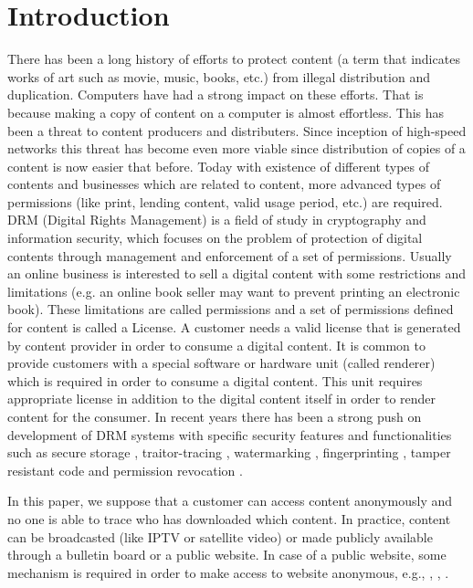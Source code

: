 \documentclass[times]{secauth}
\begin{document}
\section{Introduction}
There has been a long history of efforts to protect content (a term that indicates works of art such as movie, music, books, etc.) from illegal distribution and duplication. Computers have had a strong impact on these efforts. That is because making a copy of content on a computer is almost effortless. This has been a threat to content producers and distributers. Since inception of high-speed networks this threat has become even more viable since distribution of copies of a content is now easier that before. Today with existence of different types of contents and businesses which are related to content, more advanced types of permissions (like print, lending content, valid usage period, etc.) are required.
DRM (Digital Rights Management) is a field of study in cryptography and information security, which focuses on the problem of protection of digital contents through management and enforcement of a set of permissions. Usually an online business is interested to sell a digital content with some restrictions and limitations (e.g. an online book seller may want to prevent printing an electronic book). These limitations are called permissions and a set of permissions defined for content is called a License. A customer needs a valid license that is generated by content provider in order to consume a digital content. It is common to provide customers with a special software or hardware unit (called renderer) which is required in order to consume a digital content. This unit requires appropriate license in addition to the digital content itself in order to render content for the consumer. 
In recent years there has been a strong push on development of DRM systems with specific security features and functionalities such as secure storage \cite{N1}, traitor-tracing \cite{N2, N3, N4, N5, N6, N7, N8}, watermarking \cite{N9, N10, N11, N12, N13}, fingerprinting \cite{N14, N15}, tamper resistant code \cite{N16, N17, N18} and permission revocation \cite{N6, N7, N8, N19}.

In this paper, we suppose that a customer can access content anonymously and no one is able to trace who has downloaded which content. In practice, content can be broadcasted (like IPTV \cite{N20} or satellite video) or made publicly available through a bulletin board or a public website. In case of a public website, some mechanism is required in order to make access to website anonymous, e.g., \cite{N21}, \cite{N22}, \cite{N23}.
\end{document}
